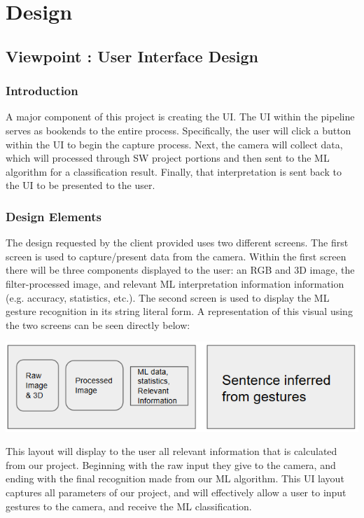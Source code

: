 \documentclass[onecolumn, draftclsnofoot,10pt, compsoc]{IEEEtran}
\begin{document}
\section{Design}
\subsection{Viewpoint : User Interface Design}
\subsubsection{Introduction}
A major component of this project is creating the UI.
The UI within the pipeline serves as bookends to the entire process. Specifically, the user will click a button within the UI to begin the capture process. Next, the camera will collect data, which will processed through SW project portions and then sent to the ML algorithm for a classification result. Finally, that interpretation is sent back to the UI to be presented to the user.
\subsubsection{Design Elements}
The design requested by the client provided uses two different screens. The first screen is used to capture/present data from the camera. Within the first screen there will be three components displayed to the user: an RGB and 3D image, the filter-processed image, and  relevant ML interpretation information information (e.g. accuracy, statistics, etc.). The second screen is used to display the ML gesture recognition in its string literal form. A representation of this visual using the two screens can be seen directly below:
\vskip 0.2in

\centerline{
   \includegraphics[width=150mm]{the_diagram_from_the_clients.png}
}
\vskip 0.2in
This layout will display to the user all relevant information that is calculated from our project. Beginning with the raw input they give to the camera, and ending with the final recognition made from our ML algorithm. This UI layout captures all parameters of our project, and will effectively allow a user to input gestures to the camera, and receive the ML classification.
\end{document}
